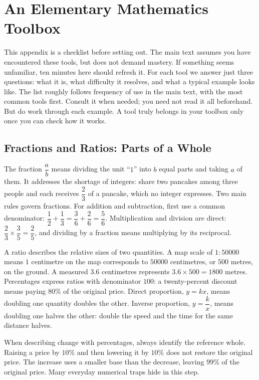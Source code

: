 \chapter{An Elementary Mathematics Toolbox}

This appendix is a checklist before setting out. The main text assumes you have encountered these tools, but does not demand mastery. If something seems unfamiliar, ten minutes here should refresh it. For each tool we answer just three questions: what it is, what difficulty it resolves, and what a typical example looks like. The list roughly follows frequency of use in the main text, with the most common tools first. Consult it when needed; you need not read it all beforehand. But do work through each example. A tool truly belongs in your toolbox only once you can check how it works.

\section{Fractions and Ratios: Parts of a Whole}

The fraction $\dfrac{a}{b}$ means dividing the unit ``$1$'' into $b$ equal parts and taking $a$ of them. It addresses the shortage of integers: share two pancakes among three people and each receives $\dfrac{2}{3}$ of a pancake, which no integer expresses. Two main rules govern fractions. For addition and subtraction, first use a common denominator: $\dfrac{1}{2}+\dfrac{1}{3}=\dfrac{3}{6}+\dfrac{2}{6}=\dfrac{5}{6}$. Multiplication and division are direct: $\dfrac{2}{3}\times\dfrac{3}{5}=\dfrac{2}{5}$, and dividing by a fraction means multiplying by its reciprocal.

A ratio describes the relative sizes of two quantities. A map scale of $1:50000$ means $1$ centimetre on the map corresponds to $50000$ centimetres, or $500$ metres, on the ground. A measured $3.6$ centimetres represents $3.6\times500=1800$ metres. Percentages express ratios with denominator $100$: a twenty-percent discount means paying $80\%$ of the original price. Direct proportion, $y=kx$, means doubling one quantity doubles the other. Inverse proportion, $y=\dfrac{k}{x}$, means doubling one halves the other: double the speed and the time for the same distance halves.

When describing change with percentages, always identify the reference whole. Raising a price by $10\%$ and then lowering it by $10\%$ does not restore the original price. The increase uses a smaller base than the decrease, leaving $99\%$ of the original price. Many everyday numerical traps hide in this step.

